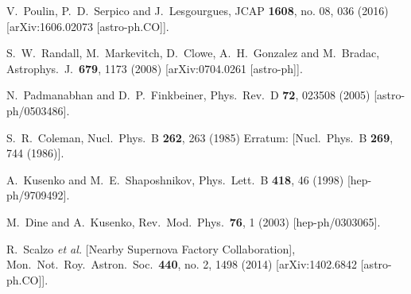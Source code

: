 \documentclass[twocolumn, preprintnumbers,amsmath,amssymb,prd, superscriptaddress]{revtex4}
\begin{document}
\begin{thebibliography}{99}
  V.~Poulin, P.~D.~Serpico and J.~Lesgourgues,
  JCAP {\bf 1608}, no. 08, 036 (2016)
  [arXiv:1606.02073 [astro-ph.CO]].


  S.~W.~Randall, M.~Markevitch, D.~Clowe, A.~H.~Gonzalez and M.~Bradac,
  Astrophys.\ J.\  {\bf 679}, 1173 (2008)
  [arXiv:0704.0261 [astro-ph]].


  N.~Padmanabhan and D.~P.~Finkbeiner,
  Phys.\ Rev.\ D {\bf 72}, 023508 (2005)
  [astro-ph/0503486].


  S.~R.~Coleman,
  Nucl.\ Phys.\ B {\bf 262}, 263 (1985)
  Erratum: [Nucl.\ Phys.\ B {\bf 269}, 744 (1986)].


  A.~Kusenko and M.~E.~Shaposhnikov,
  Phys.\ Lett.\ B {\bf 418}, 46 (1998)
  [hep-ph/9709492].


  M.~Dine and A.~Kusenko,
  Rev.\ Mod.\ Phys.\  {\bf 76}, 1 (2003)
  [hep-ph/0303065].


  R.~Scalzo {\it et al.} [Nearby Supernova Factory Collaboration],
  Mon.\ Not.\ Roy.\ Astron.\ Soc.\  {\bf 440}, no. 2, 1498 (2014)
  [arXiv:1402.6842 [astro-ph.CO]].



\end{thebibliography}
\end{document}

